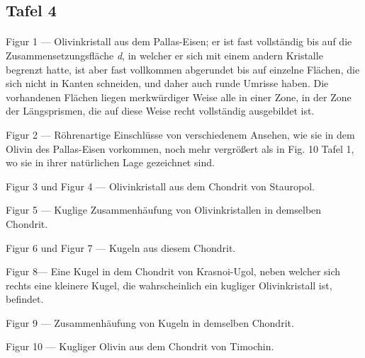 \documentclass[a4paper, 11pt, oneside]{article}
\begin{document}
\subsection{Tafel 4}
\paragraph{}
Figur 1 --- Olivinkristall aus dem Pallas-Eisen; er ist fast vollständig bis auf die Zusammensetzungsfläche \emph{d}, in welcher er sich mit einem andern Kristalle begrenzt hatte, ist aber fast vollkommen abgerundet bis auf einzelne Flächen, die sich nicht in Kanten schneiden, und daher auch runde Umrisse haben. Die vorhandenen Flächen liegen merkwürdiger Weise alle in einer Zone, in der Zone der Längsprismen, die auf diese Weise recht vollständig ausgebildet ist.

Figur 2 --- Röhrenartige Einschlüsse von verschiedenem Ansehen, wie sie in dem Olivin des Pallas-Eisen vorkommen, noch mehr vergrößert als in Fig. 10 Tafel 1, wo sie in ihrer natürlichen Lage gezeichnet sind.

Figur 3 und Figur 4 --- Olivinkristall aus dem Chondrit von Stauropol.

Figur 5 --- Kuglige Zusammenhäufung von Olivinkristallen in demselben Chondrit.

Figur 6 und Figur 7 --- Kugeln aus diesem Chondrit.

Figur 8--- Eine Kugel in dem Chondrit von Krasnoi-Ugol, neben welcher sich rechts eine kleinere Kugel, die wahrscheinlich ein kugliger Olivinkristall ist, befindet.

Figur 9 --- Zusammenhäufung von Kugeln in demselben Chondrit.

Figur 10 --- Kugliger Olivin aus dem Chondrit von Timochin.
\end{document}
